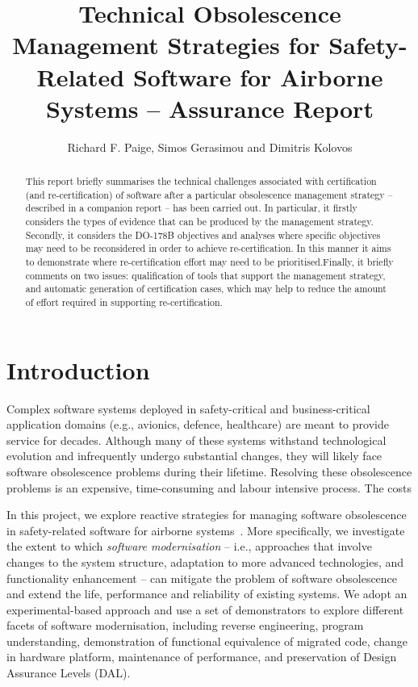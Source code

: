 \documentclass{llncs}
\begin{document}
\title{Technical Obsolescence Management Strategies for Safety-Related Software for Airborne Systems -- Assurance Report}

\author{Richard F. Paige, Simos Gerasimou and Dimitris Kolovos}

\maketitle

\begin{abstract}
This report briefly summarises the technical challenges associated with certification (and re-certification)
of software after a particular obsolescence management strategy -- described in a companion report -- has
been carried out. In particular, it firstly considers the types of evidence that can
be produced by the management strategy. Secondly, it considers the DO-178B objectives and analyses where specific objectives
may need to be reconsidered in order to achieve re-certification. In this manner it aims to demonstrate where
re-certification effort may need to be prioritised.Finally, it briefly comments on two issues: qualification of tools that support
the management strategy, and automatic generation of certification cases, which may help to reduce the amount of effort 
required in supporting re-certification.
\end{abstract}

\section{Introduction}
Complex software systems deployed in safety-critical and business-critical 
application domains (e.g., avionics, defence, healthcare) are meant to provide 
service for decades. Although many of these systems withstand technological 
evolution and infrequently undergo substantial changes, they will likely face 
software obsolescence problems during their lifetime. 
Resolving these obsolescence problems is an expensive, time-consuming and 
labour intensive process. The costs

In this project, we explore reactive strategies for managing software 
obsolescence in safety-related software for airborne 
systems~\cite{ProjectResponse}. More specifically, we 
investigate the extent to which \textit{software modernisation} -- i.e., 
approaches that involve changes to the system 
structure, adaptation to more advanced technologies, and functionality 
enhancement -- can mitigate the problem of software obsolescence and extend the 
life, performance and reliability of existing systems. We adopt an 
experimental-based approach and use a set of demonstrators to explore different 
facets of software modernisation, 
including reverse engineering, program understanding, demonstration of 
functional equivalence of 
migrated code, change in hardware platform, maintenance of performance, and 
preservation of Design Assurance Levels (DAL).
\end{document}
